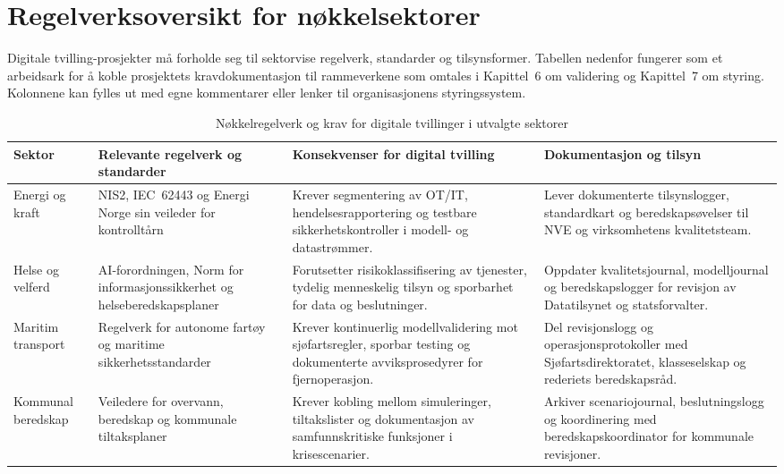 \section{Regelverksoversikt for nøkkelsektorer}
Digitale tvilling-prosjekter må forholde seg til sektorvise regelverk, standarder og tilsynsformer.
Tabellen nedenfor fungerer som et arbeidsark for å koble prosjektets kravdokumentasjon til
rammeverkene som omtales i Kapittel~6 om validering og Kapittel~7 om styring. Kolonnene kan fylles
ut med egne kommentarer eller lenker til organisasjonens styringssystem.

\begin{table}[htbp]
    \centering
    \caption{Nøkkelregelverk og krav for digitale tvillinger i utvalgte sektorer}
    \label{tab:appendiks-regelverk}
    \begin{tabular}{p{3.0cm}p{4.8cm}p{4.8cm}p{3.0cm}}
        \toprule
        \textbf{Sektor} & \textbf{Relevante regelverk og standarder} & \textbf{Konsekvenser for digital tvilling} & \textbf{Dokumentasjon og tilsyn} \\
        \midrule
        Energi og kraft & NIS2, IEC~62443 og Energi Norge sin veileder for kontrolltårn\citep{eu2022nis2,iec62443-2-1,energinorge2023beredskap} & Krever segmentering av OT/IT, hendelsesrapportering og testbare sikkerhetskontroller i modell- og datastrømmer. & Lever dokumenterte tilsynslogger, standardkart og beredskapsøvelser til NVE og virksomhetens kvalitetsteam. \\
        \addlinespace
        Helse og velferd & AI-forordningen, Norm for informasjonssikkerhet og helseberedskapsplaner\citep{eu2024aiact,norm2023,helsedir2023beredskap} & Forutsetter risikoklassifisering av tjenester, tydelig menneskelig tilsyn og sporbarhet for data og beslutninger. & Oppdater kvalitetsjournal, modelljournal og beredskapslogger for revisjon av Datatilsynet og statsforvalter. \\
        \addlinespace
        Maritim transport & Regelverk for autonome fartøy og maritime sikkerhetsstandarder\citep{sdir2023autonomefartoy,dnv2024autonomous,massterly2023operations} & Krever kontinuerlig modellvalidering mot sjøfartsregler, sporbar testing og dokumenterte avviksprosedyrer for fjernoperasjon. & Del revisjonslogg og operasjonsprotokoller med Sjøfartsdirektoratet, klasseselskap og rederiets beredskapsråd. \\
        \addlinespace
        Kommunal beredskap & Veiledere for overvann, beredskap og kommunale tiltaksplaner\citep{nve2022kommunal,dsb2022beredskap,oslo2023overvann} & Krever kobling mellom simuleringer, tiltakslister og dokumentasjon av samfunnskritiske funksjoner i krisescenarier. & Arkiver scenariojournal, beslutningslogg og koordinering med beredskapskoordinator for kommunale revisjoner. \\
        \bottomrule
    \end{tabular}
\end{table}

